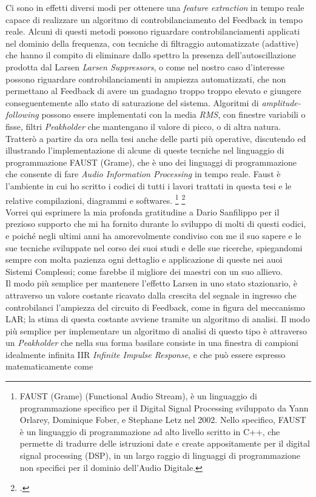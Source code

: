 Ci sono in effetti diversi modi per ottenere una \textit{feature extraction} 
in tempo reale capace di realizzare un algoritmo di controbilanciamento 
del Feedback in tempo reale.
Alcuni di questi metodi possono riguardare controbilanciamenti 
applicati nel dominio della frequenza,
con tecniche di filtraggio automatizzate (adattive) che
hanno il compito di eliminare dallo spettro la presenza dell'autoscillazione prodotta dal Larsen \textit{Larsen Suppressors},
o come nel nostro caso d’interesse possono riguardare controbilanciamenti in ampiezza
automatizzati, che non permettano al Feedback di avere un guadagno troppo troppo elevato 
e giungere conseguentemente allo stato di saturazione del sistema.
Algoritmi di \textit{amplitude-following} possono essere implementati 
con la media \textit{RMS}, con finestre variabili o fisse, 
filtri \textit{Peakholder} che mantengano il valore di picco, o di altra natura. \\
Tratterò a partire da ora nella tesi anche delle parti più operative, 
discutendo ed illustrando l'implementazione
di alcune di queste tecniche nel linguaggio di programmazione FAUST (Grame), 
che è uno dei linguaggi di programmazione
che consente di fare \textit{Audio Information Processing} in tempo reale.
Faust è l'ambiente in cui ho scritto i codici di tutti i lavori trattati
in questa tesi e le relative compilazioni, diagrammi e softwares.
\footnote{FAUST (Grame) (Functional Audio Stream), 
è un linguaggio di programmazione specifico per il Digital Signal
Processing sviluppato da Yann Orlarey, Dominique Fober, e Stephane Letz nel
2002. Nello specifico, FAUST è un linguaggio di programmazione ad alto livello
scritto in C++, che permette di tradurre delle istruzioni date e create 
appositamente per il digital signal processing (DSP), in un largo raggio di linguaggi
di programmazione non specifici per il dominio dell’Audio Digitale.} \footcite{https://faust.grame.fr/} \\
Vorrei qui esprimere la mia profonda gratitudine a 
Dario Sanfilippo per il prezioso supporto che mi ha fornito durante 
lo sviluppo di molti di questi codici,
e poiché negli ultimi anni ha amorevolmente condiviso con me il suo sapere e le sue tecniche 
sviluppate nel corso dei suoi studi e delle sue ricerche, 
spiegandomi sempre con molta pazienza ogni dettaglio e applicazione 
di queste nei auoi Sistemi Complessi;
come farebbe il migliore dei maestri con un suo allievo. \\
Il modo più semplice per mantenere l’effetto Larsen in uno stato stazionario, è attraverso un
valore costante ricavato dalla crescita del segnale in ingresso 
che controbilanci l’ampiezza del circuito di Feedback, come in figura del meccanismo LAR;
la stima di questa costante avviene tramite un algoritmo di analisi.
Il modo più semplice per implementare un algoritmo di analisi di questo tipo
è attraverso un \textit{Peakholder} che nella sua forma basilare consiste in una finestra 
di campioni idealmente infinita IIR \textit{Infinite Impulse Response},
e che può essere espresso matematicamente come

